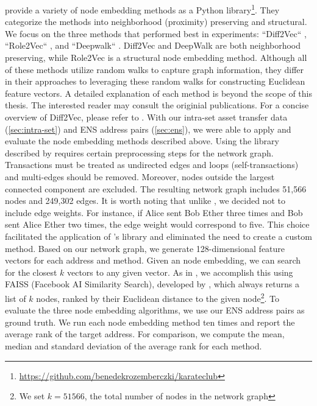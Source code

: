 \documentclass[12pt,a4paper,titlepage,oneside,english]{article}
\begin{document}
\cite{karateclub} provide a variety of node embedding methods as a Python library\footnote{\url{https://github.com/benedekrozemberczki/karateclub}}. They categorize the methods into neighborhood (proximity) preserving and structural. \newline
We focus on the three methods that performed best in \cite{Beres2020} experiments: ``Diff2Vec`` \citep{rozemberczki2020difftovec}, ``Role2Vec`` \citep{ahmed2018roletovec}, and ``Deepwalk`` \citep{perozzi2014}. Diff2Vec and DeepWalk are both neighborhood preserving, while Role2Vec is a structural node embedding method. Although all of these methods utilize random walks to capture graph information, they differ in their approaches to leveraging these random walks for constructing Euclidean feature vectors. A detailed explanation of each method is beyond the scope of this thesis. The interested reader may consult the originial publications. For a concise overview of Diff2Vec, please refer to \cite{wu2022tutela}. \newline
With our intra-set asset transfer data (\ref{sec:intra-set}) and ENS address pairs (\ref{sec:ens}), we were able to apply and evaluate the node embedding methods described above. Using the library described by \cite{karateclub} requires certain preprocessing steps for the network graph. Transactions must be treated as undirected edges and loops (self-transactions) and multi-edges should be removed. Moreover, nodes outside the largest connected component are excluded. The resulting network graph includes 51,566 nodes and 249,302 edges. \newline
It is worth noting that unlike \cite{wu2022tutela}, we decided not to include edge weights. For instance, if Alice sent Bob Ether three times and Bob sent Alice Ether two times, the edge weight would correspond to five. This choice facilitated the application of \cite{rozemberczki2020difftovec}'s library and eliminated the need to create a custom method. \newline
Based on our network graph, we generate 128-dimensional feature vectors for each address and method. \newline
Given an node embedding, we can search for the closest $k$ vectors to any given vector. As in \cite{wu2022tutela}, we accomplish this using FAISS (Facebook AI Similarity Search), developed by \cite{johnson2019faiss}, which always returns a list of $k$ nodes, ranked by their Euclidean distance to the given node\footnote{We set $k = 51566$, the total number of nodes in the network graph}. \newline
To evaluate the three node embedding algorithms, we use our ENS address pairs as ground truth. We run each node embedding method ten times and report the average rank of the target address. For comparison, we  compute the mean, median and standard deviation of the average rank for each method.
\end{document}

